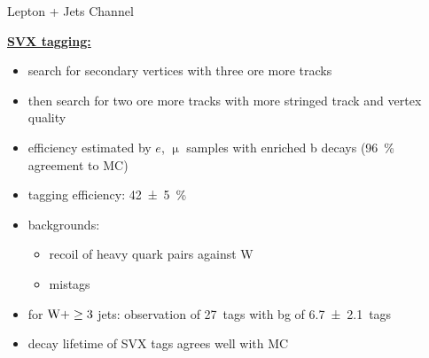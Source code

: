 \begin{frame}{Lepton + Jets Channel}
	
	\underline{\textbf{SVX tagging:}}\vspace*{5pt}
	\begin{itemize}\itemfill 
		\item search for secondary vertices with three ore more tracks
		\item then search for two ore more tracks with more stringed track and vertex quality
		\item efficiency estimated by $e$, $\upmu$ samples with enriched b decays (\SI{96}{\%} agreement to MC)
		\item tagging efficiency: \SI{42\pm5}{\%}
	\end{itemize}
	
	\begin{minipage}[c][.35\textheight]{.64\textwidth}
	 	\begin{itemize}\itemfill
			\item backgrounds:
			\begin{itemize}
				\item recoil of heavy quark pairs against W 
				\item mistags
			\end{itemize}
	 	 	\item for $\text{W}+\ge3$ jets: observation of \SI{27}{tags} with bg of \SI{6.7\pm2.1}{tags}
	 	 	\item decay lifetime of SVX tags agrees well with MC
	 	\end{itemize}
	\end{minipage}
	\begin{minipage}{.33\textwidth}
	\end{minipage}

\end{frame}
